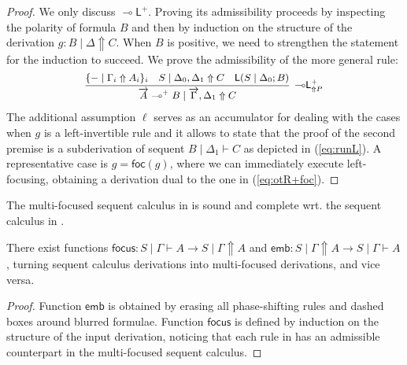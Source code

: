 \documentclass[runningheads]{llncs}
\renewcommand{\vec}{\overrightarrow}
\newcommand{\lleft}{{\multimap}\mathsf{L}}
\newcommand{\lolliL}{\lleft}
\newcommand{\lolli}{\multimap}
\renewcommand{\L}{\mathsf{L}}
\newcommand{\up}{\Uparrow}
\newcommand{\foc}{\mathsf{foc}}
\newcommand{\focus}{\mathsf{focus}}
\newcommand{\emb}{\mathsf{emb}}
\begin{document}
\begin{proof}
  We only discuss $\lolliL^+$. Proving its admissibility proceeds by inspecting the polarity of formula $B$ and then by induction on the structure of the derivation $g : B \mid \Delta \up C$. When $B$ is positive, we need to strengthen the statement for the induction to succeed. We prove the admissibility of the more general rule:
  \[
  \small
  \begin{array}{c}
    \infer[\lolliL^+_{\up P}]{\vec{A} \lolli^+ B \mid \vec{\Gamma} , \Delta_1 \up C}{
      \{ - \mid \Gamma_i \up A_i \}_{i}
      &
      S \mid \Delta_0,\Delta_1 \up C
      &
      \L(S\mid \Delta_0;B)
    }
  \end{array}
  \]
  The additional assumption $\ell$ serves as an accumulator for dealing with the cases when $g$ is a left-invertible rule
  and it allows to state that the proof of the second premise is a subderivation of sequent $B \mid \Delta_1 \vdash C$ as depicted in (\ref{eq:runL}). A representative case is $g = \foc(g)$, where we can immediately execute left-focusing, obtaining a derivation dual to the one in (\ref{eq:otR+foc}).
\end{proof}
The multi-focused sequent calculus in  is sound and complete wrt. the sequent calculus in .
\begin{theorem}\label{thm}
  There exist functions $\focus : S \mid \Gamma \vdash A \to S \mid \Gamma \up A$  and $\emb: S \mid \Gamma \up A \to S \mid \Gamma \vdash A$, turning sequent calculus derivations into multi-focused derivations, and vice versa.
\end{theorem}
\begin{proof}
Function $\emb$ is obtained by erasing all phase-shifting rules and dashed boxes around blurred formulae. Function $\focus$ is defined by induction on the structure of the input derivation, noticing that each rule in  has an admissible counterpart in the multi-focused sequent calculus.
\end{proof}
\end{document}
